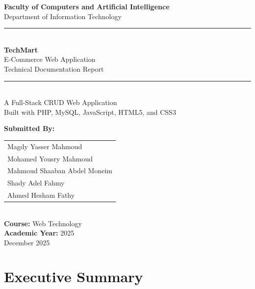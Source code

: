 \documentclass[12pt,a4paper]{article}
\begin{document}
\begin{titlepage}
    \centering
    \vspace*{1cm}
    
    {\Large\textbf{Faculty of Computers and Artificial Intelligence}\\[0.3cm]}
    {\large Department of Information Technology\\[2cm]}
    
    \rule{\textwidth}{1.5pt}\\[0.5cm]
    {\Huge\bfseries TechMart\\[0.3cm]}
    {\LARGE E-Commerce Web Application\\[0.3cm]}
    {\large Technical Documentation Report\\[0.5cm]}
    \rule{\textwidth}{1.5pt}\\[2cm]
    
    {\large A Full-Stack CRUD Web Application\\
    Built with PHP, MySQL, JavaScript, HTML5, and CSS3\\[2cm]}
    
    \vfill
    
    {\large\textbf{Submitted By:}\\[0.5cm]}
    \begin{tabular}{l}
    Magdy Yasser Mahmoud \\
    Mohamed Yousry Mahmoud \\
    Mahmoud Shaaban Abdel Moneim \\
    Shady Adel Fahmy \\
    Ahmed Hesham Fathy \\
    \end{tabular}\\[2cm]
    
    {\large\textbf{Course:} Web Technology\\[0.2cm]}
    {\large\textbf{Academic Year:} 2025\\[0.2cm]}
    {\large December 2025}
    
\end{titlepage}

\tableofcontents
\newpage

\section{Executive Summary}
\end{document}
